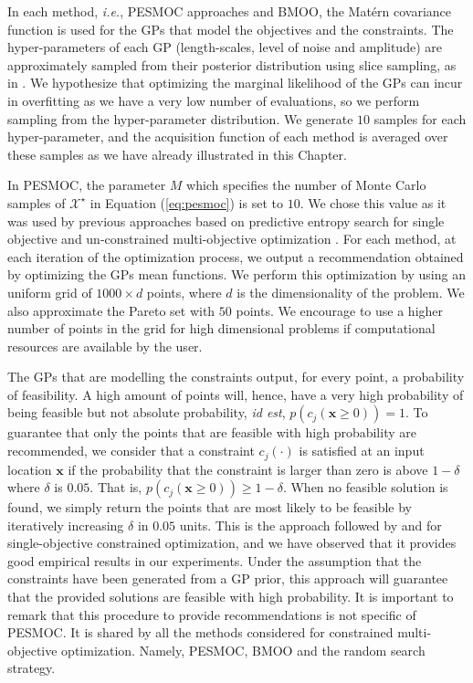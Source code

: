 In each method, \emph{i.e.}, PESMOC approaches and BMOO, the Mat\'ern covariance function is used for the GPs that model the
objectives and the constraints. The hyper-parameters of each GP (length-scales, level of noise and amplitude) are
approximately sampled from their posterior distribution using slice sampling, as in \citep{snoek2012practical}. We 
hypothesize that optimizing the marginal likelihood of the GPs can incur in overfitting as we have a very low
number of evaluations, so we perform sampling from the hyper-parameter distribution.
We generate $10$ samples for each hyper-parameter, and the acquisition function of each method is
averaged over these samples as we have already illustrated in this Chapter.

In PESMOC, the parameter $M$ which specifies the number of Monte Carlo samples of $\mathcal{X}^\star$ in Equation (\ref{eq:pesmoc})
is set to $10$. We chose this value as it was used by previous approaches based on predictive entropy search for single objective and
un-constrained multi-objective optimization \citep{hernandez2016general,hernandez2016predictive}.
For each method, at each iteration of the optimization process, we output a recommendation
obtained by optimizing the GPs mean functions. We perform this optimization by using an uniform grid of $1000\times d$ points, where $d$ is
the dimensionality of the problem. We also approximate the Pareto set with $50$ points. We encourage to use a higher number of points in the grid for high dimensional problems if computational resources are available by the user.

The GPs that are modelling the constraints output, for every point, a probability of feasibility. A high amount of points will, hence, have 
a very high probability of being feasible but not absolute probability, \textit{id est}, $p(c_j(\mathbf{x}\geq 0)) = 1$. To guarantee that only the points that are feasible with high probability are recommended, we consider that a constraint
$c_j(\cdot)$ is satisfied at an input location $\mathbf{x}$ if the probability that the constraint is larger than zero is
above $1-\delta$ where $\delta$ is $0.05$. That is, $p(c_j(\mathbf{x}\geq 0)) \geq 1 - \delta$.
When no feasible solution is found, we simply return the points that are most likely to
be feasible by iteratively increasing $\delta$ in $0.05$ units. This is the approach followed by
\cite{gelbart2014bayesian} and \cite{hernandez2016general} for single-objective constrained
optimization, and we have observed that it provides good empirical results in our experiments.
Under the assumption that the constraints have been generated from a GP prior, this approach will
guarantee that the provided solutions are feasible with high probability. It is important to remark that this procedure to provide recommendations
is not specific of PESMOC. It is shared by all the methods considered for constrained multi-objective optimization. Namely,
PESMOC, BMOO and the random search strategy.


